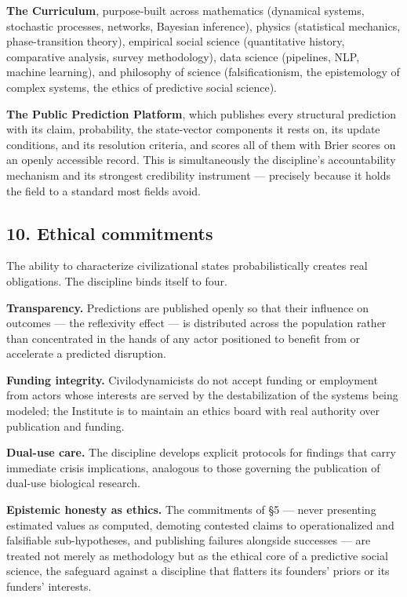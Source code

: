 \documentclass[
]{article}
\begin{document}
\textbf{The Curriculum}, purpose-built across mathematics (dynamical
systems, stochastic processes, networks, Bayesian inference), physics
(statistical mechanics, phase-transition theory), empirical social
science (quantitative history, comparative analysis, survey
methodology), data science (pipelines, NLP, machine learning), and
philosophy of science (falsificationism, the epistemology of complex
systems, the ethics of predictive social science).

\textbf{The Public Prediction Platform}, which publishes every
structural prediction with its claim, probability, the state-vector
components it rests on, its update conditions, and its resolution
criteria, and scores all of them with Brier scores on an openly
accessible record. This is simultaneously the discipline's
accountability mechanism and its strongest credibility instrument ---
precisely because it holds the field to a standard most fields avoid.

\subsection{10. Ethical commitments}\label{ethical-commitments}

The ability to characterize civilizational states probabilistically
creates real obligations. The discipline binds itself to four.

\textbf{Transparency.} Predictions are published openly so that their
influence on outcomes --- the reflexivity effect --- is distributed
across the population rather than concentrated in the hands of any actor
positioned to benefit from or accelerate a predicted disruption.

\textbf{Funding integrity.} Civilodynamicists do not accept funding or
employment from actors whose interests are served by the destabilization
of the systems being modeled; the Institute is to maintain an ethics
board with real authority over publication and funding.

\textbf{Dual-use care.} The discipline develops explicit protocols for
findings that carry immediate crisis implications, analogous to those
governing the publication of dual-use biological research.

\textbf{Epistemic honesty as ethics.} The commitments of §5 --- never
presenting estimated values as computed, demoting contested claims to
operationalized and falsifiable sub-hypotheses, and publishing failures
alongside successes --- are treated not merely as methodology but as the
ethical core of a predictive social science, the safeguard against a
discipline that flatters its founders' priors or its funders' interests.
\end{document}
